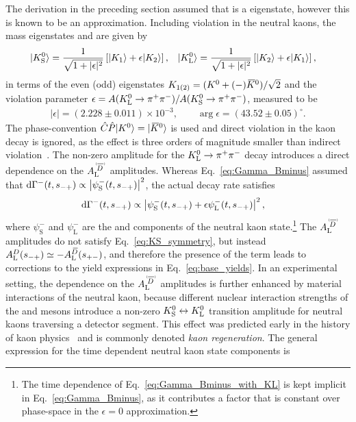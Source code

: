 The derivation in the preceding section assumed that \KS is a \CP eigenstate, however this is known to be an approximation. Including \CP violation in the neutral kaons, the mass eigenstates \KS and \KL are given by
\begin{align}
    |{{K}^0_{\mathrm{S}}}\rangle   &= \frac{1}{\sqrt{ 1+|\epsilon|^2}} \left[|K_1\rangle + \epsilon |K_2\rangle\right], &
    |{{K}^0_{\mathrm{L}}}\rangle   &= \frac{1}{\sqrt{ 1+|\epsilon|^2}} \left[|K_2\rangle + \epsilon |K_1\rangle\right],
\end{align}
in terms of the \CP even (odd) eigenstates $K_{1(2)}=({{K}^0}+(-){{\kern 0.18em\overline{\kern -0.18em K}}{}^0})/\sqrt{2}$ and the \CP violation parameter
$
\epsilon = A({{K}^0_{\mathrm{L}}}\rightarrow{\ensuremath{{\pi}^+}}{\ensuremath{{\pi}^-}})/A({{K}^0_{\mathrm{S}}}\rightarrow{\ensuremath{{\pi}^+}}{\ensuremath{{\pi}^-}})
$, measured to be~\cite{PDG2018}  
\begin{align}\label{eq:PDG_epsilon}
    |\epsilon|=(2.228\pm 0.011)\times 10^{-3}, \qquad \arg \epsilon = (43.52\pm 0.05)^\circ.
\end{align}
The phase-convention $\hat C\hat P |{{K}^0}\rangle=|{{\kern 0.18em\overline{\kern -0.18em K}}{}^0}\rangle$ is used and direct \CP violation in the kaon decay is ignored, as the effect is three orders of magnitude smaller than indirect \CP violation~\cite{PDG2018}. The non-zero amplitude for the ${{K}^0_{\mathrm{L}}}\rightarrow{\ensuremath{{\pi}^+}}{\ensuremath{{\pi}^-}}$ decay introduces a direct dependence on the $\ADorDbL$ amplitudes.  Whereas Eq.~\eqref{eq:Gamma_Bminus} assumed that $\text{d} \Gamma^-(t, s_{-+}) \propto \left|\psi^-_\text{S}(t, s_{-+})\right|^2$, the actual decay rate satisfies
\begin{align}\label{eq:Gamma_Bminus_with_KL}
    \text{d} \Gamma^-(t, s_{-+}) &\propto \left|\psi^-_\text{S}(t, s_{-+}) + \epsilon \psi^-_\text{L}(t, s_{-+})\right|^2,
\end{align}
where $\psi^-_\text{S}$ and $\psi^-_\text{L}$ are the \KS and \KL components of the neutral kaon state.\footnote{The time dependence of Eq.~\eqref{eq:Gamma_Bminus_with_KL} is kept implicit in Eq.~\eqref{eq:Gamma_Bminus}, as it contributes a factor that is constant over phase-space in the $\epsilon=0$ approximation.} The $\ADorDbL$ amplitudes do not satisfy Eq.~\eqref{eq:KS_symmetry}, but instead $A_{\rm L}^{D}(s_{-+})\simeq-A_{\rm L}^{{\kern 0.18em\overline{\kern -0.18em D}}}(s_{+-})$, and therefore the presence of the \KL term leads to corrections to the yield expressions in Eq.~\eqref{eq:base_yields}. In an experimental setting, the dependence on the $\ADorDbL$ amplitudes is further enhanced by material interactions of the neutral kaon, because different nuclear interaction strengths of the \Kz and \Kzb mesons introduce a non-zero ${{K}^0_{\mathrm{S}}}\leftrightarrow{\ensuremath{{K}^0_{\mathrm{L}}}}$ transition amplitude for neutral kaons traversing a detector segment. This effect was predicted early in the history of kaon physics~\cite{PaisPiccioni1955} and is commonly denoted \emph{kaon regeneration}. The general expression for the time dependent neutral kaon state components is~\cite{Good1957,Fetscher1996}
